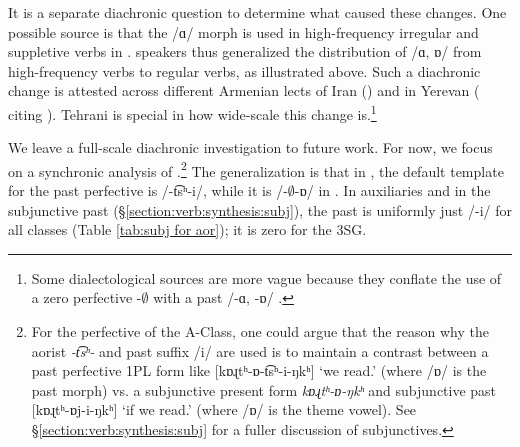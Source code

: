It is a separate diachronic question to determine what caused these changes. One possible source is that the /{ɑ}/ morph is used in high-frequency irregular and suppletive verbs in {\seaSEA}. {\iaIA} speakers thus generalized the distribution of /ɑ, {ɒ}/ from high-frequency verbs to regular verbs, as illustrated above. Such a diachronic change is attested across different Armenian lects of Iran (\cites[201]{Adjarian-1961-Liakatar4Book2Conj}{Martirosyan-2019-Armeniandialects}) and {\seaCEA} in Yerevan (\citealt[230]{DumTragut-2009-ArmenianReferenceGrammar} citing \cites[98]{Gharagyulyan-1981-ColloquialArmenian}{Avetyan-2020-TendenciesAnalogicalArmenianAorist}). Tehrani {\iaIA} is special in how wide-scale this change is.\footnote{Some dialectological sources are more vague because they conflate the use of a zero perfective -$\emptyset$ with a past /-ɑ, -ɒ/ \citep[p. 102, feature 95]{Jahukyan-1972-ArmenianDiaolectology}. }


We leave a full-scale diachronic investigation to future work. For now, we focus on a synchronic analysis of {\iaIA}.\footnote{For the perfective of the A-Class, one could argue that the reason why the aorist \textit{{-t͡sʰ-}} and past suffix /{i}/ are used is to maintain a contrast between a past perfective 1PL form like [{{kɒɻtʰ-ɒ-t͡sʰ-i-ŋkʰ}}] `we read.{\pst}' (where /{ɒ}/ is the past morph) vs. a subjunctive present form \textit{{kɒɻtʰ-ɒ-ŋkʰ}} and subjunctive past [{{kɒɻtʰ-ɒj-i-ŋkʰ}}] `if we read.{\pst}' (where /{ɒ}/ is the theme vowel). See \S\ref{section:verb:synthesis:subj} for a fuller discussion of subjunctives.} The generalization is that in {\seaSE}, the default template for the past perfective is /{-t͡sʰ-i}/, while it is /{-$\emptyset$-ɒ}/ in {\iaIA}. In auxiliaries and in the subjunctive past   (\S\ref{section:verb:synthesis:subj}), the past is uniformly just /{-i}/ for all classes (Table \ref{tab:subj for aor}); it is zero for the 3SG. 

